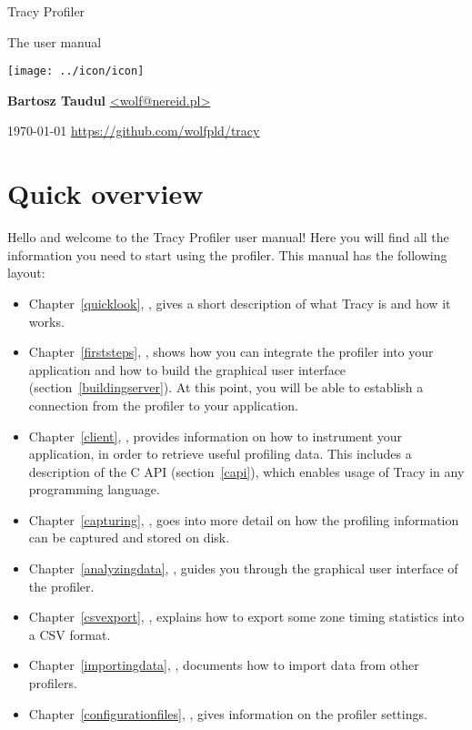 \documentclass[hidelinks,titlepage,a4paper,twoside]{article}
\begin{document}
\begin{titlepage}
\centering
{\fontsize{120}{140}\selectfont Tracy Profiler}

\vspace{50pt} {\Huge{}\selectfont The user manual}

\vfill \texttt{[image: ../icon/icon]}

\vfill
\large\textbf{Bartosz Taudul} \href{mailto:wolf@nereid.pl}{<wolf@nereid.pl>}

\vspace{10pt}
\today
\vfill
\url{https://github.com/wolfpld/tracy}
\end{titlepage}

\section*{Quick overview}

Hello and welcome to the Tracy Profiler user manual! Here you will find all the information you need to start using the profiler. This manual has the following layout:

\begin{itemize}
\item Chapter~\ref{quicklook}, \emph{}, gives a short description of what Tracy is and how it works.
\item Chapter~\ref{firststeps}, \emph{}, shows how you can integrate the profiler into your application and how to build the graphical user interface (section~\ref{buildingserver}). At this point, you will be able to establish a connection from the profiler to your application.
\item Chapter~\ref{client}, \emph{}, provides information on how to instrument your application, in order to retrieve useful profiling data. This includes a description of the C API (section~\ref{capi}), which enables usage of Tracy in any programming language.
\item Chapter~\ref{capturing}, \emph{}, goes into more detail on how the profiling information can be captured and stored on disk.
\item Chapter~\ref{analyzingdata}, \emph{}, guides you through the graphical user interface of the profiler.
\item Chapter~\ref{csvexport}, \emph{}, explains how to export some zone timing statistics into a CSV format.
\item Chapter~\ref{importingdata}, \emph{}, documents how to import data from other profilers.
\item Chapter~\ref{configurationfiles}, \emph{}, gives information on the profiler settings.
\end{itemize}
\end{document}

